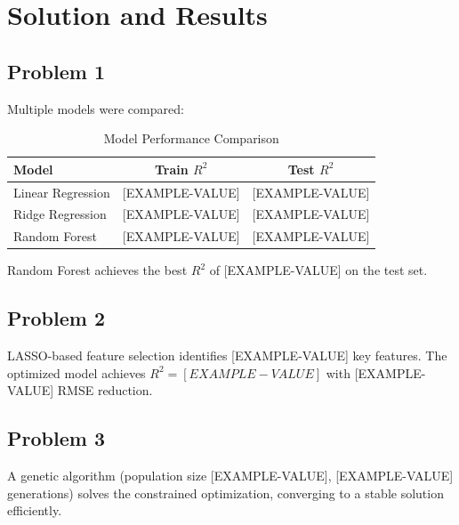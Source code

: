 \section{Solution and Results}

\subsection{Problem 1}
Multiple models were compared:

\begin{table}[htbp]
  \centering
  \caption{Model Performance Comparison}
  \begin{tabular}{lcc}
    \toprule
    \textbf{Model} & \textbf{Train $R^2$} & \textbf{Test $R^2$} \\
    \midrule
    Linear Regression & [EXAMPLE-VALUE] & [EXAMPLE-VALUE] \\
    Ridge Regression   & [EXAMPLE-VALUE] & [EXAMPLE-VALUE] \\
    Random Forest      & [EXAMPLE-VALUE] & [EXAMPLE-VALUE] \\
    \bottomrule
  \end{tabular}
\end{table}

Random Forest achieves the best $R^2$ of [EXAMPLE-VALUE] on the test set.

\subsection{Problem 2}
LASSO-based feature selection identifies [EXAMPLE-VALUE] key features. The optimized model
achieves $R^2 = [EXAMPLE-VALUE]$ with [EXAMPLE-VALUE] RMSE reduction.

\subsection{Problem 3}
A genetic algorithm (population size [EXAMPLE-VALUE], [EXAMPLE-VALUE] generations) solves the
constrained optimization, converging to a stable solution efficiently.
